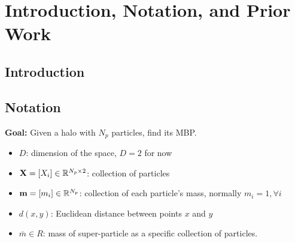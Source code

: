 
\section{Introduction, Notation, and Prior Work}
\label{sec:intro}
\subsection{Introduction}
\subsection{Notation}
 {\bf Goal:} Given a halo with $N_p$ particles, find its MBP.
 \begin{itemize}
   \item $D$: dimension of the space, $D=2$ for now
   \item ${\bf X}=[X_i]\in \mathbb{R}^{N_p\times 2}$: collection of particles
   \item ${\bf m}=[m_i]\in \mathbb{R}^{N_p}$: collection of each particle's mass, normally $m_i=1, \forall i$
   \item $d(x,y)$: Euclidean distance between points $x$ and $y$
   \item $\bar m \in R$: mass of super-particle as a specific collection of particles.  
   \end{itemize}

